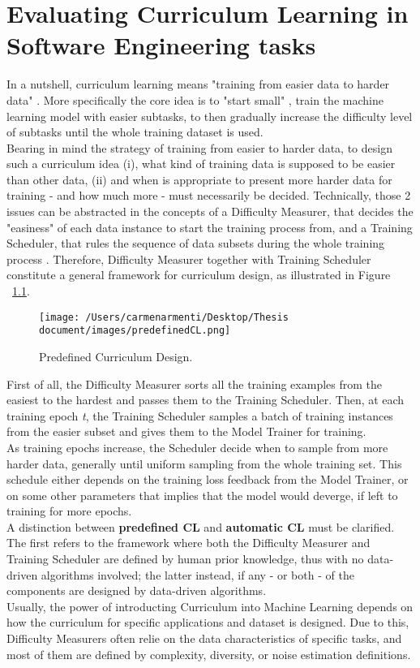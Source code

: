 \chapter{Evaluating Curriculum Learning in Software Engineering tasks}
In a nutshell, curriculum learning means "training from easier data to harder data" \cite{Wang2020}. More specifically the
core idea is to "start small" \cite{ELMAN199371}, train the machine learning model with easier subtasks, to then gradually increase
the difficulty level of subtasks until the whole training dataset is used.\\
Bearing in mind the strategy of training from easier to harder data, to design such a curriculum idea 
(i), what kind of training data is supposed to be easier than other data, (ii) and when is appropriate to present more harder
data for training - and how much more - must necessarily be decided.
Technically, those 2 issues can be abstracted in the concepts of a Difficulty Measurer, that decides the "easiness"
of each data instance to start the training process from, and a Training Scheduler, that rules the sequence of data subsets during 
the whole training process \cite{Wang2020}.
Therefore, Difficulty Measurer together with Training Scheduler constitute a general framework for curriculum design,
as illustrated in Figure ~\ref{fig:CLdesign}.
\begin{figure}[h]
    \begin{center}
        \texttt{[image: /Users/carmenarmenti/Desktop/Thesis document/images/predefinedCL.png]}
        \caption{\label{fig:CLdesign}Predefined Curriculum Design.}
    \end{center}
\end{figure}
First of all, the Difficulty Measurer sorts all the training examples from the easiest 
to the hardest and passes them to the Training Scheduler. Then, at each training epoch \textit{t}, the Training Scheduler
samples a batch of training instances from the easier subset and gives them to the Model Trainer for training.\\
As training epochs increase, the Scheduler decide when to sample from more harder data, generally until uniform sampling
from the whole training set. This schedule either depends on the training loss feedback from the Model Trainer, or on some other
parameters that implies that the model would deverge, if left to training for more epochs.\\
A distinction between \textbf{predefined CL} and \textbf{automatic CL} must be clarified. The first refers to the framework
where both the Difficulty Measurer and Training Scheduler are defined by human prior knowledge, thus with no data-driven
algorithms involved; the latter instead, if any - or both - of the components are designed by data-driven algorithms.\\
Usually, the power of introducting Curriculum into Machine Learning depends on how the curriculum for specific
applications and dataset is designed. Due to this, Difficulty Measurers often relie on the data
characteristics of specific tasks, and most of them are defined by complexity, diversity, or noise estimation
definitions.\\


